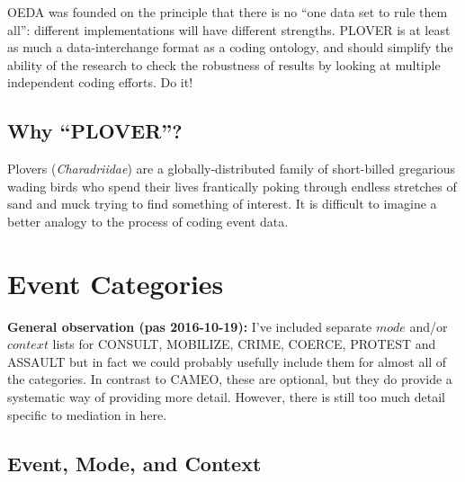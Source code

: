 \documentclass[11pt]{report}
\newcommand{\plcat}[1]{\textsf{#1}}
\begin{document}
OEDA was founded on the principle that there is no ``one data set to rule them all'': different implementations will have different strengths. PLOVER is at least as much a data-interchange format as a coding ontology, and should simplify the ability of the research to check the robustness of results by looking at multiple independent coding efforts. Do it!



\section{Why ``PLOVER''?}

Plovers (\textit{Charadriidae}) are a globally-distributed family of short-billed gregarious wading birds who spend their lives frantically poking through endless stretches of sand and muck trying to find something of interest. It is difficult to imagine a better analogy to the process of coding event data.


\chapter{Event Categories}

\textbf{General observation (pas 2016-10-19):} I've included separate $mode$ and/or $context$ lists for \plcat{CONSULT, MOBILIZE, CRIME, COERCE, PROTEST} and \plcat{ASSAULT} but in fact we could probably usefully include them for almost all of the categories. In contrast to CAMEO, these are optional, but they do provide a systematic way of providing more detail. However, there is still too much detail specific to mediation in here.

\section{Event, Mode, and Context}\label{ssec:ecm}
\end{document}

